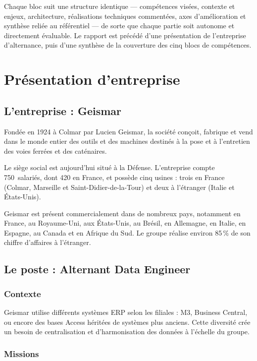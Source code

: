\documentclass[11pt]{article}
\begin{document}
Chaque bloc suit une structure identique --- compétences visées, contexte et enjeux,
architecture, réalisations techniques commentées, axes d'amélioration et synthèse
reliée au référentiel --- de sorte que chaque partie soit autonome et directement
évaluable. Le rapport est précédé d'une présentation de l'entreprise d'alternance,
puis d'une synthèse de la couverture des cinq blocs de compétences.

\section{Présentation d'entreprise}

\subsection{L'entreprise : Geismar}

Fondée en 1924 à Colmar par Lucien Geismar, la société conçoit, fabrique et vend
dans le monde entier des outils et des machines destinés à la pose et à l'entretien
des voies ferrées et des caténaires.

Le siège social est aujourd'hui situé à la Défense. L'entreprise compte
750~salariés, dont 420 en France, et possède cinq usines : trois en France (Colmar,
Marseille et Saint-Didier-de-la-Tour) et deux à l'étranger (Italie et États-Unis).

Geismar est présent commercialement dans de nombreux pays, notamment en France, au
Royaume-Uni, aux États-Unis, au Brésil, en Allemagne, en Italie, en Espagne, au
Canada et en Afrique du Sud. Le groupe réalise environ 85\,\% de son chiffre
d'affaires à l'étranger.

\subsection{Le poste : Alternant Data Engineer}

\subsubsection{Contexte}

Geismar utilise différents systèmes ERP selon les filiales : M3, Business Central,
ou encore des bases Access héritées de systèmes plus anciens. Cette diversité crée un
besoin de centralisation et d'harmonisation des données à l'échelle du groupe.

\subsubsection{Missions}
\end{document}

